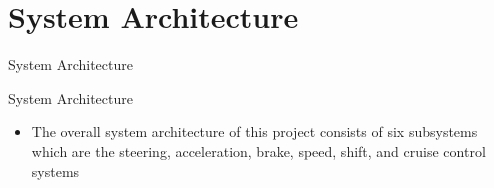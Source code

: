 \documentclass{beamer}
\begin{document}

\section{System Architecture}

\begin{frame}{System Architecture}
  \begin{block}{System Architecture}
 \begin{itemize}
        \item The overall system architecture of this project consists of six subsystems which are the steering, acceleration, brake, speed, shift, and cruise control systems
\end{itemize}
  \end{block}
\end{frame}
\end{document}
